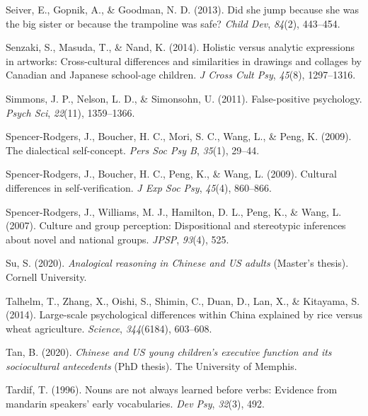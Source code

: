 \documentclass[
  man]{apa6}
\newlength{\cslhangindent}
\newlength{\cslentryspacingunit} %
\newenvironment{CSLReferences}[2] %
 {%
  \setlength{\parindent}{0pt}
  \ifodd #1
  \let\oldpar\par
  \def\par{\hangindent=\cslhangindent\oldpar}
  \fi
  \setlength{\parskip}{#2\cslentryspacingunit}
 }%
 {}
\begin{document}
\begin{CSLReferences}{1}{0}
\leavevmode{}%
Seiver, E., Gopnik, A., \& Goodman, N. D. (2013). Did she jump because she was the big sister or because the trampoline was safe? \emph{Child Dev}, \emph{84}(2), 443--454.

\leavevmode{}%
Senzaki, S., Masuda, T., \& Nand, K. (2014). Holistic versus analytic expressions in artworks: Cross-cultural differences and similarities in drawings and collages by {C}anadian and {J}apanese school-age children. \emph{J Cross Cult Psy}, \emph{45}(8), 1297--1316.

\leavevmode{}%
Simmons, J. P., Nelson, L. D., \& Simonsohn, U. (2011). False-positive psychology. \emph{Psych Sci}, \emph{22}(11), 1359--1366.

\leavevmode{}%
Spencer-Rodgers, J., Boucher, H. C., Mori, S. C., Wang, L., \& Peng, K. (2009). The dialectical self-concept. \emph{Pers Soc Psy B}, \emph{35}(1), 29--44.

\leavevmode{}%
Spencer-Rodgers, J., Boucher, H. C., Peng, K., \& Wang, L. (2009). Cultural differences in self-verification. \emph{J Exp Soc Psy}, \emph{45}(4), 860--866.

\leavevmode{}%
Spencer-Rodgers, J., Williams, M. J., Hamilton, D. L., Peng, K., \& Wang, L. (2007). Culture and group perception: Dispositional and stereotypic inferences about novel and national groups. \emph{JPSP}, \emph{93}(4), 525.

\leavevmode{}%
Su, S. (2020). \emph{Analogical reasoning in {C}hinese and {US} adults} (Master's thesis). Cornell University.

\leavevmode{}%
Talhelm, T., Zhang, X., Oishi, S., Shimin, C., Duan, D., Lan, X., \& Kitayama, S. (2014). Large-scale psychological differences within {C}hina explained by rice versus wheat agriculture. \emph{Science}, \emph{344}(6184), 603--608.

\leavevmode{}%
Tan, B. (2020). \emph{Chinese and US young children's executive function and its sociocultural antecedents} (PhD thesis). The University of Memphis.

\leavevmode{}%
Tardif, T. (1996). Nouns are not always learned before verbs: Evidence from mandarin speakers' early vocabularies. \emph{Dev Psy}, \emph{32}(3), 492.


\end{CSLReferences}
\end{document}

